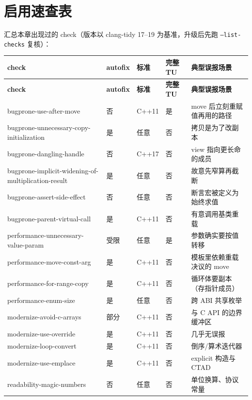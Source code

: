 \documentclass[12pt,a4paper,fontset=fandol]{ctexbook}
\newcommand{\cpp}[1]{C++#1}
\newcommand{\Bk}{\discretionary{}{}{}}
\begin{document}
\section{启用速查表}\label{sec:ch13-s9}
汇总本章出现过的 check（版本以 clang-tidy 17--19 为基准，升级后先跑 \texttt{--list-{\Bk}checks} 复核）：
{\small
\begin{longtable}{>{\raggedright\arraybackslash}p{} >{\raggedright\arraybackslash}p{} >{\raggedright\arraybackslash}p{} >{\raggedright\arraybackslash}p{} >{\raggedright\arraybackslash}p{}}
\textbf{check} & \textbf{autofix} & \textbf{标准} & \textbf{完整 TU} & \textbf{典型误报场景}\\ \midrule
\endfirsthead
\textbf{check} & \textbf{autofix} & \textbf{标准} & \textbf{完整 TU} & \textbf{典型误报场景}\\ \midrule
\endhead
bugprone-use-after-move & 否 & \cpp{11} & 是 & move 后立刻重赋值再用的路径\\
bugprone-unnecessary-copy-initialization & 是 & 任意 & 否 & 拷贝是为了改副本\\
bugprone-dangling-handle & 否 & \cpp{17} & 否 & view 指向更长命的成员\\
bugprone-implicit-widening-of-multiplication-result & 是 & 任意 & 否 & 故意先窄算再截断\\
bugprone-assert-side-effect & 否 & 任意 & 否 & 断言宏被定义为始终求值\\
bugprone-parent-virtual-call & 是 & \cpp{11} & 否 & 有意调用基类重载\\
performance-unnecessary-value-param & 受限 & 任意 & 是 & 参数确实要按值转移\\
performance-move-const-arg & 是 & \cpp{11} & 否 & 模板里依赖重载决议的 move\\
performance-for-range-copy & 是 & \cpp{11} & 否 & 循环体要副本（存指针成员）\\
performance-enum-size & 是 & 任意 & 否 & 跨 ABI 共享枚举\\
modernize-avoid-c-arrays & 部分 & \cpp{11} & 否 & 与 C API 的边界缓冲区\\
modernize-use-override & 是 & \cpp{11} & 否 & 几乎无误报\\
modernize-loop-convert & 是 & \cpp{11} & 否 & 倒序/算术迭代器\\
modernize-use-emplace & 是 & \cpp{11} & 否 & explicit 构造与 CTAD\\
readability-magic-numbers & 否 & 任意 & 否 & 单位换算、协议常量\\

\end{longtable}}
\end{document}
